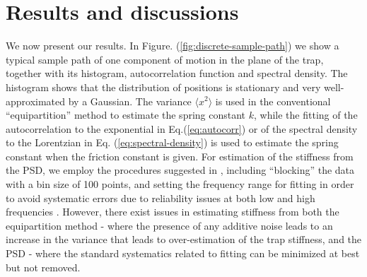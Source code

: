\documentclass[english,aps, twocolumn, pre,superscriptaddress]{revtex4-1}
\begin{document}
\section{Results and discussions\label{sec:Results}}

We now present our results. In Figure. (\ref{fig:discrete-sample-path})
we show a typical sample path of one component of motion in the plane
of the trap, together with its histogram, autocorrelation function
and spectral density. The histogram shows that the distribution of
positions is stationary and very well-approximated by a Gaussian.
The variance $\langle x^{2}\rangle$ is used in the conventional ``equipartition''
method to estimate the spring constant $k$, while the fitting of
the autocorrelation to the exponential in Eq.(\ref{eq:autocorr})
or of the spectral density to the Lorentzian in Eq. (\ref{eq:spectral-density})
is used to estimate the spring constant when the friction constant
is given. For estimation of the stiffness from the PSD, we employ
the procedures suggested in \cite{berg2004power}, including ``blocking''
the data with a bin size of 100 points, and setting the frequency
range for fitting in order to avoid systematic errors due to reliability
issues at both low and high frequencies \cite{berg2004power}. However,
there exist issues in estimating stiffness from both the equipartition
method - where the presence of any additive noise leads to an increase
in the variance that leads to over-estimation of the trap stiffness,
and the PSD - where the standard systematics related to fitting can
be minimized at best but not removed. 
\end{document}
